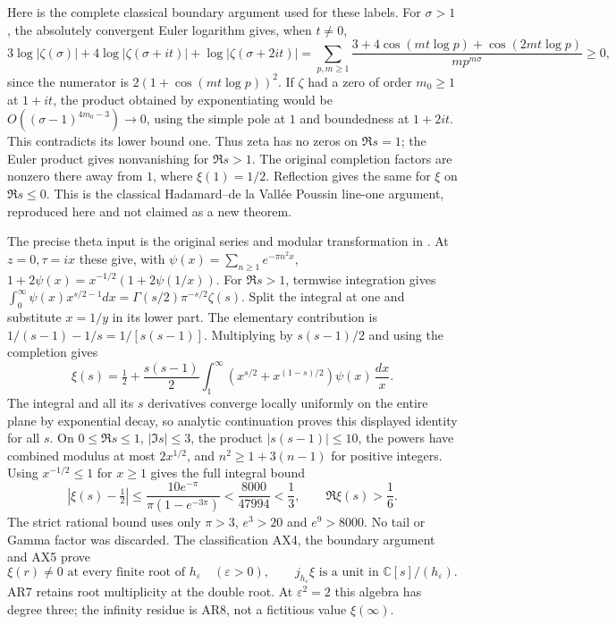\documentclass[11pt]{article}
\newcommand{\C}{\mathbb C}
\begin{document}
Here is the complete classical boundary argument used for
these labels. For $\sigma>1$, the absolutely convergent Euler
logarithm gives, when $t\ne0$,
\[
3\log|\zeta(\sigma)|+4\log|\zeta(\sigma+it)|
 +\log|\zeta(\sigma+2it)|
=\sum_{p,m\ge1}
\frac{3+4\cos(mt\log p)+\cos(2mt\log p)}{mp^{m\sigma}}\ge0,
\]
since the numerator is $2(1+\cos(mt\log p))^2$.
If $\zeta$ had a zero of order $m_0\ge1$ at $1+it$,
the product obtained by exponentiating would be
$O((\sigma-1)^{4m_0-3})\to0$, using the simple pole
at $1$ and boundedness at $1+2it$. This contradicts its
lower bound one. Thus zeta has no zeros on $\Re s=1$;
the Euler product gives nonvanishing for $\Re s>1$.
The original completion factors are nonzero there away
from $1$, where $\xi(1)=1/2$. Reflection gives the same
for $\xi$ on $\Re s\le0$. This is the classical
Hadamard--de la Vallée Poussin line-one argument, reproduced
here and not claimed as a new theorem.

The precise theta input is the original series and modular
transformation in \cite{DLMFTheta}. At $z=0,\tau=ix$ these give,
with $\psi(x)=\sum_{n\ge1}e^{-\pi n^2x}$,
$1+2\psi(x)=x^{-1/2}(1+2\psi(1/x))$.
For $\Re s>1$, termwise integration gives
$\int_0^\infty\psi(x)x^{s/2-1}dx
=\Gamma(s/2)\pi^{-s/2}\zeta(s)$.
Split the integral at one and substitute $x=1/y$ in its
lower part. The elementary contribution is
$1/(s-1)-1/s=1/[s(s-1)]$.
Multiplying by $s(s-1)/2$ and using the completion gives
\[
\xi(s)=\tfrac12+\frac{s(s-1)}2
\int_1^\infty(x^{s/2}+x^{(1-s)/2})\psi(x)\,\frac{dx}{x}.
\]
The integral and all its $s$ derivatives converge locally
uniformly on the entire plane by exponential decay, so
analytic continuation proves this displayed identity for all $s$.
On $0\le\Re s\le1$, $|\Im s|\le3$, the product
$|s(s-1)|\le10$, the powers have combined modulus at most
$2x^{1/2}$, and $n^2\ge1+3(n-1)$ for positive integers.
Using $x^{-1/2}\le1$ for $x\ge1$ gives the full integral bound
\begin{equation}
\left|\xi(s)-\tfrac12\right|
\le\frac{10e^{-\pi}}{\pi(1-e^{-3\pi})}
<\frac{8000}{47994}<\frac13,\qquad \Re\xi(s)>\frac16.
\tag{AX5}
\end{equation}
The strict rational bound uses only $\pi>3$, $e^3>20$ and
$e^9>8000$. No tail or Gamma factor was discarded.
The classification AX4, the boundary argument and AX5 prove
\begin{equation}
\xi(r)\ne0\text{ at every finite root of }h_\varepsilon
\quad(\varepsilon>0),\qquad
j_{h_\varepsilon}\xi\text{ is a unit in }\C[s]/(h_\varepsilon).
\tag{AX6}
\end{equation}
AR7 retains root multiplicity at the double root. At
$\varepsilon^2=2$ this algebra has degree three; the infinity
residue is AR8, not a fictitious value $\xi(\infty)$.
\end{document}
